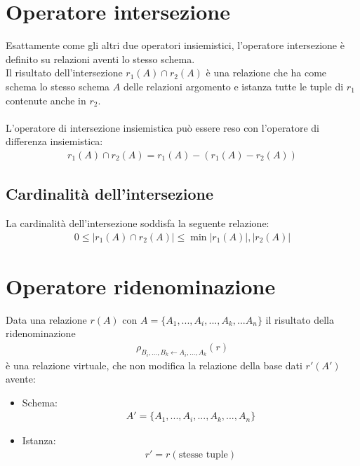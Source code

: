\section{Operatore intersezione}
Esattamente come gli altri due operatori insiemistici, l'operatore intersezione è definito su relazioni aventi lo stesso schema.\\
Il risultato dell'intersezione $r_1(A) \cap r_2(A)$ è una relazione che ha come schema lo stesso schema $A$ delle relazioni argomento e istanza tutte le tuple di $r_1$ contenute anche in $r_2$.\\\\
L'operatore di intersezione insiemistica può essere reso con l'operatore di differenza insiemistica:
    \begin{equation}\begin{aligned}
        r_1(A) \cap r_2(A) = r_1(A) - (r_1(A) - r_2(A))
    \end{aligned}\end{equation}
    
\subsection{Cardinalità dell'intersezione}
La cardinalità dell'intersezione soddisfa la seguente relazione:
    \begin{equation}\begin{aligned}
        0 \leq |r_1(A) \cap r_2(A)| \leq \min{|r_1(A)|, |r_2(A)|}
    \end{aligned}\end{equation}

\section{Operatore ridenominazione}
Data una relazione $r(A)$ con $A = \{   A_1, ..., A_i, ..., A_k, ... A_n   \}$ il risultato della ridenominazione
    \begin{equation}\begin{aligned}
        \rho_{B_i, ..., B_k \leftarrow
        A_i, ..., A_k}(r)
    \end{aligned}\end{equation}
è una relazione virtuale, che non modifica la relazione della base dati $r'(A')$ avente:
    \begin{itemize}
        \item{Schema:
            \begin{equation}\begin{aligned}
                A' = \{ A_1, ..., A_i, ..., A_k, ..., A_n   \}
            \end{aligned}\end{equation}}
        \item{Istanza:
            \begin{equation}\begin{aligned}
                r' = r (\text{stesse tuple})
            \end{aligned}\end{equation}}
    \end{itemize}

